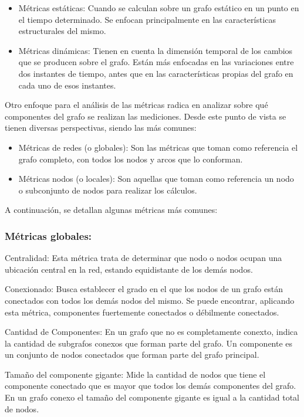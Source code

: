 	\begin{itemize}
		\item Métricas estáticas: Cuando se calculan sobre un grafo estático en un punto en el tiempo determinado. Se enfocan principalmente en las características estructurales del mismo.
		\item Métricas dinámicas: Tienen en cuenta la dimensión temporal de los cambios que se producen sobre el grafo. Están más enfocadas en las variaciones entre dos instantes de tiempo, antes que en las características propias del grafo en cada uno de esos instantes.
	\end{itemize}
	
	Otro enfoque para el análisis de las métricas radica en analizar sobre qué componentes del grafo se realizan las mediciones. Desde este punto de vista se tienen diversas perspectivas, siendo las más comunes:
	
	\begin{itemize}
		\item Métricas de redes (o globales): Son las métricas que toman como referencia el grafo completo, con todos los nodos y arcos que lo conforman.
		\item Métricas nodos (o locales): Son aquellas que toman como referencia un nodo o subconjunto de nodos para realizar los cálculos.
	\end{itemize}
	
	A continuación, se detallan algunas métricas más comunes:
	
	\subsubsection{Métricas globales:}
	
	Centralidad: Esta métrica trata de determinar que nodo o nodos ocupan una ubicación central en la red, estando equidistante de los demás nodos.
	
	Conexionado: Busca establecer el grado en el que los nodos de un grafo están conectados con todos los demás nodos del mismo. Se puede encontrar, aplicando esta métrica, componentes fuertemente conectados o débilmente conectados.
	
	Cantidad de Componentes: En un grafo que no es completamente conexto, indica la cantidad de subgrafos conexos que forman parte del grafo. Un componente es un conjunto de nodos conectados que forman parte del grafo principal.
	
	Tamaño del componente gigante: Mide la cantidad de nodos que tiene el componente conectado que es mayor que todos los demás componentes del grafo. En un grafo conexo el tamaño del componente gigante es igual a la cantidad total de nodos.
	
